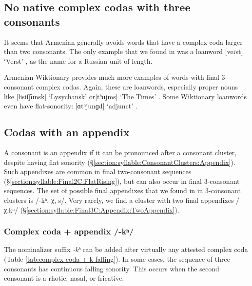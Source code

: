 	\subsection{No native complex codas with three consonants}\label{section:syllable:Final3C:NoNative}
	It seems that Armenian generally avoids words that have a complex coda larger than two consonants. The only example that we found in \citeauthor{kouyoumdjian-1970-DictionaryArmenianEnglish}  was a loanword [veɾst] `Verst' , as the name for a Russian unit of length. 
	
	Armenian Wiktionary provides much more examples of words with final 3-consonant complex codas. Again, these are loanwords, especially   proper nouns like [lisit͡ʃɑnsk]  `Lysychansk'   or[tʰɑjms] `The Times'  . Some Wiktionary loanwords even have flat-sonority: [ɑtʰjunɡd] `adjunct' .  
	
	\subsection{Codas with  an appendix}\label{section:syllable:Final3C:Appendix}
	A consonant is an appendix if it can be pronounced after a consonant cluster, despite having flat sonority (\S\ref{section:syllable:ConsonantClusters:Appendix}). Such appendixes are common in final two-consonant sequences (\S\ref{section:syllable:Final2C:FlatRising}), but can also occur in final 3-consonant sequences.  The set of possible final appendixes that we found in in 3-consonant clusters is     /-kʰ, χ, s/. Very rarely, we find a cluster with two final appendixes /χ,kʰ/ (\S\ref{section:syllable:Final3C:Appendix:TwoAppendix}). 
	\subsubsection{Complex coda + appendix /-kʰ/ }\label{section:syllable:Final3C:Appendix:K}
	
	The nominalizer suffix \textit{-kʰ} can be added after virtually any attested complex coda (Table \ref{tab:complex coda + k falling}). In some cases, the sequence of three consonants has continuous falling sonority. This occurs when the second consonant is a rhotic, nasal, or fricative. 
	

